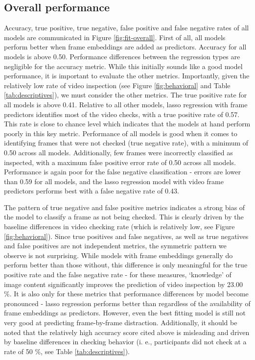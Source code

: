\documentclass[
  man]{apa6}
\begin{document}
\hypertarget{overall-performance}{%
\subsection{Overall performance}\label{overall-performance}}

Accuracy, true positive, true negative, false positive and false negative rates of all models are communicated in Figure \ref{fig:fit-overall}. First of all, all models perform better when frame embeddings are added as predictors. Accuracy for all models is above 0.50. Performance differences between the regression types are negligible for the accuracy metric. While this initially sounds like a good model performance, it is important to evaluate the other metrics. Importantly, given the relatively low rate of video inspection (see Figure \ref{fig:behavioral} and Table \ref{tab:descriptives}), we must consider the other metrics. The true positive rate for all models is above 0.41. Relative to all other models, lasso regression with frame predictors identifies most of the video checks, with a true positive rate of 0.57. This rate is close to chance level which indicates that the models at hand perform poorly in this key metric. Performance of all models is good when it comes to identifying frames that were not checked (true negative rate), with a minimum of 0.50 across all models. Additionally, few frames were incorrectly classified as inspected, with a maximum false positive error rate of 0.50 across all models. Performance is again poor for the false negative classification - errors are lower than 0.59 for all models, and the lasso regression model with video frame predictors performs best with a false negative rate of 0.43.

The pattern of true negative and false positive metrics indicates a strong bias of the model to classify a frame as not being checked. This is clearly driven by the baseline differences in video checking rate (which is relatively low, see Figure \ref{fig:behavioral}). Since true positives and false negatives, as well as true negatives and false positives are not independent metrics, the symmetric pattern we observe is not surprising. While models with frame embeddings generally do perform better than those without, this difference is only meaningful for the true positive rate and the false negative rate - for these measures, `knowledge' of image content significantly improves the prediction of video inspection by 23.00 \%. It is also only for these metrics that performance differences by model become pronounced - lasso regression performs better than regardless of the availability of frame embeddings as predictors. However, even the best fitting model is still not very good at predicting frame-by-frame distraction.
Additionally, it should be noted that the relatively high accuracy score cited above is misleading and driven by baseline differences in checking behavior (i. e., participants did not check at a rate of 50 \%, see Table \ref{tab:descriptives}).
\end{document}
